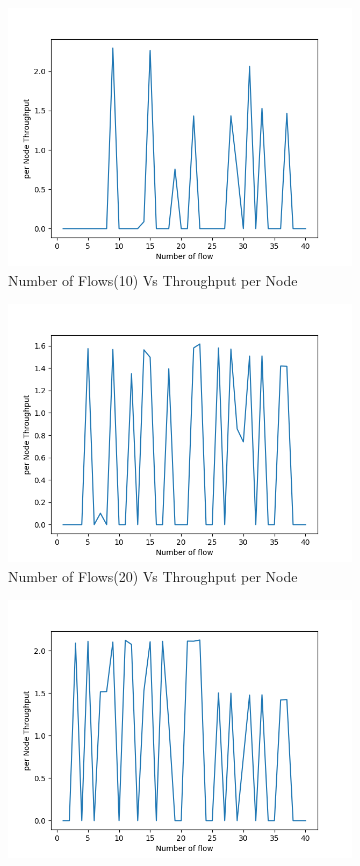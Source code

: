 \begin{figure}[h]
\begin{subfigure}{.5\textwidth}
  \centering
  \includegraphics[width=.8\linewidth]{_15_4_static/NumberofFlow(10)vsperNodeThroughput.png}
     \caption{Number of Flows(10) Vs Throughput per Node}
 \end{subfigure}
\begin{subfigure}{.5\textwidth}
  \centering
  \includegraphics[width=.8\linewidth]{_15_4_static/NumberofFlow(20)vsperNodeThroughput.png}
     \caption{Number of Flows(20) Vs Throughput per Node}
    \end{subfigure}
\begin{subfigure}{.5\textwidth}
    \centering
    \includegraphics[width=.8\linewidth]{_15_4_static/NumberofFlow(30)vsperNodeThroughput.png}

\end{subfigure}
\end{figure}
